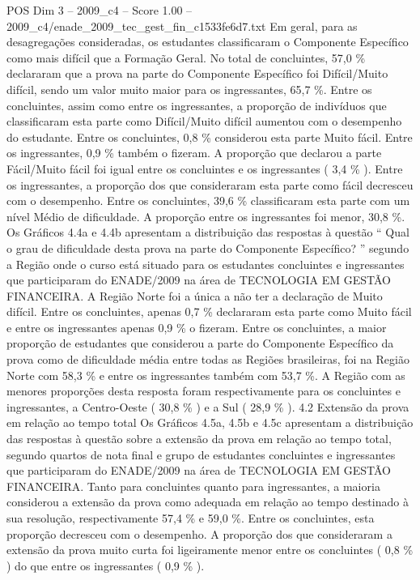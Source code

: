 \begin{textsample}{POS Dim 3 – 2009\_c4 – Score 1.00 – 2009\_c4/enade\_2009\_tec\_gest\_fin\_c1533fe6d7.txt}
Em geral, para as desagregações consideradas, os estudantes classificaram o Componente Específico como mais difícil que a Formação Geral.
No total de concluintes, 57,0 \% declararam que a prova na parte do Componente Específico foi Difícil/Muito difícil, sendo um valor muito maior para os ingressantes, 65,7 \%.
Entre os concluintes, assim como entre os ingressantes, a proporção de indivíduos que classificaram esta parte como Difícil/Muito difícil aumentou com o desempenho do estudante.
Entre os concluintes, 0,8 \% considerou esta parte Muito fácil.
Entre os ingressantes, 0,9 \% também o fizeram.
A proporção que declarou a parte Fácil/Muito fácil foi igual entre os concluintes e os ingressantes ( 3,4 \% ).
Entre os ingressantes, a proporção dos que consideraram esta parte como fácil decresceu com o desempenho.
Entre os concluintes, 39,6 \% classificaram esta parte com um nível Médio de dificuldade.
A proporção entre os ingressantes foi menor, 30,8 \%.
Os Gráficos 4.4a e 4.4b apresentam a distribuição das respostas à questão “ Qual o grau de dificuldade desta prova na parte do Componente Específico? ” segundo a Região onde o curso está situado para os estudantes concluintes e ingressantes que participaram do ENADE/2009 na área de TECNOLOGIA EM GESTÃO FINANCEIRA.
A Região Norte foi a única a não ter a declaração de Muito difícil.
Entre os concluintes, apenas 0,7 \% declararam esta parte como Muito fácil e entre os ingressantes apenas 0,9 \% o fizeram.
Entre os concluintes, a maior proporção de estudantes que considerou a parte do Componente Específico da prova como de dificuldade média entre todas as Regiões brasileiras, foi na Região Norte com 58,3 \% e entre os ingressantes também com 53,7 \%.
A Região com as menores proporções desta resposta foram respectivamente para os concluintes e ingressantes, a Centro-Oeste ( 30,8 \% ) e a Sul ( 28,9 \% ). 4.2 Extensão da prova em relação ao tempo total Os Gráficos 4.5a, 4.5b e 4.5c apresentam a distribuição das respostas à questão sobre a extensão da prova em relação ao tempo total, segundo quartos de nota final e grupo de estudantes concluintes e ingressantes que participaram do ENADE/2009 na área de TECNOLOGIA EM GESTÃO FINANCEIRA.
Tanto para concluintes quanto para ingressantes, a maioria considerou a extensão da prova como adequada em relação ao tempo destinado à sua resolução, respectivamente 57,4 \% e 59,0 \%.
Entre os concluintes, esta proporção decresceu com o desempenho.
A proporção dos que consideraram a extensão da prova muito curta foi ligeiramente menor entre os concluintes ( 0,8 \% ) do que entre os ingressantes ( 0,9 \% ).

\end{textsample}
